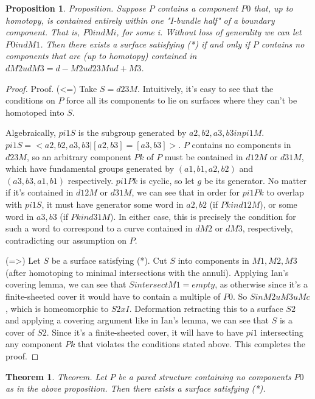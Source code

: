 \documentclass[12pt]{amsart}
\newtheorem{thm}[theorem]{Theorem}
\newtheorem{prop}[theorem]{Proposition}
\theoremstyle{definition}
\begin{document}
\begin{prop}

Proposition. Suppose $P$ contains a component $P0$ that, up to homotopy, is
contained entirely within one "I-bundle half" of a boundary component. That is,
$P0 in dMi$, for some i. Without loss of generality we can let $P0 in dM1$. Then
there exists a surface satisfying (*) if and only if $P$ contains no components
that are (up to homotopy) contained in $dM2 u dM3 = d-M2 u d23M u d+M3$.

\end{prop}
\begin{proof}

Proof. (<=) Take $S=d23M$. Intuitively, it's easy to see that the conditions on
$P$ force all its components to lie on surfaces where they can't be homotoped
into $S$.

Algebraically, $pi1S$ is the subgroup generated by
$a2,b2,a3,b3 in pi1M$. $pi1S = <a2,b2,a3,b3 | [a2,b3]=[a3,b3]>$. $P$ contains no
components in $d23M$, so an arbitrary component $Pk$ of $P$  must be contained in
$d12M$ or $d31M$, which have fundamental groups generated by $(a1,b1,a2,b2)$ and
$(a3,b3,a1,b1)$ respectively. $pi1Pk$ is cyclic, so let $g$ be its generator. No
matter if it's contained in $d12M$ or $d31M$, we can see that in order for
$pi1Pk$ to
overlap with $pi1S$, it must have generator some word in $a2,b2$ (if $Pk in
d12M$),
or some word in $a3,b3$ (if $Pk in d31M$). In either case, this is precisely the
condition for such a word to correspond to a curve contained in $dM2$ or $dM3$,
respectively, contradicting our assumption on $P$.

(=>) Let $S$ be a surface satisfying (*). Cut $S$ into components in $M1,M2,M3$
(after homotoping to minimal intersections with the annuli). Applying Ian's
covering lemma, we can see that $S intersect M1 = empty$, as otherwise since it's
a finite-sheeted cover it would have to contain a multiple of $P0$.
So $S in M2 u M3 u Mc$, which is homeomorphic to $S2 x I$. Deformation retracting
this to a surface $S2$ and applying a covering argument like in Ian's lemma, we
can see that $S$ is a cover of $S2$. Since it's a finite-sheeted cover, it will
have to have $pi1$ intersecting any component $Pk$ that violates the conditions
stated above. This completes the proof.

\end{proof}

\begin{thm}

Theorem. Let $P$ be a pared structure containing no components $P0$ as in the above
proposition. Then there exists a surface satisfying (*).

\end{thm}
\end{document}
